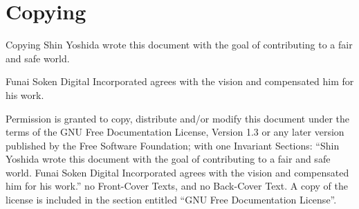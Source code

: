%
%

\section{Copying}


\begin{frame}{Copying}
    Shin Yoshida wrote this document with the goal of contributing to a fair and safe world.
    \vspace{2ex}

    Funai Soken Digital Incorporated agrees with the vision and compensated him for his work.
    \vspace{2ex}

    {\tiny
    Permission is granted to copy, distribute and/or modify this
    document under the terms of the GNU Free Documentation License,
    Version 1.3 or any later version published by the Free Software
    Foundation; with one Invariant Sections:
    ``Shin Yoshida wrote this document with the goal of contributing to a fair and safe world.
    Funai Soken Digital Incorporated agrees with the vision and compensated him for his work.''
    no Front-Cover Texts, and no Back-Cover Text. A copy of the license is
    included in the section entitled ``GNU Free Documentation License''.
    }
\end{frame}
